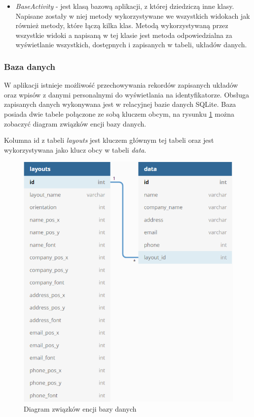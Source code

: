 \documentclass[a4paper,12pt, twoside]{article}
\begin{document}
\begin{itemize}
    	    \item \textit{BaseActivity} - jest klasą bazową aplikacji, z której dziedziczą inne klasy. Napisane zostały w niej metody wykorzystywane we wszystkich widokach jak również metody, które łączą kilka klas. Metodą wykorzystywaną przez wszystkie widoki a napisaną w tej klasie jest metoda odpowiedzialna za wyświetlanie wszystkich, dostępnych i zapisanych w tabeli, układów danych.
    	\end{itemize}
    
    
        \subsubsection{Baza danych}
        W aplikacji istnieje możliwość przechowywania rekordów zapisanych układów oraz wpisów z danymi personalnymi do wyświetlania na identyfikatorze. Obsługa zapisanych danych wykonywana jest w relacyjnej bazie danych SQLite. Baza posiada dwie tabele połączone ze sobą kluczem obcym, na rysunku \ref{fig:database} można zobaczyć diagram związków encji bazy danych. 
        
        Kolumna id z tabeli \textit{layouts} jest kluczem głównym tej tabeli oraz jest wykorzystywana jako klucz obcy w tabeli \textit{data}. 
        
        \begin{figure}[H]
    	        \centering
    	        \vspace{.5cm}
    			\includegraphics[width=12cm]{images/rys_11baza.png}
    			\vspace{.5cm}
    			\caption{Diagram związków encji bazy danych}
                \label{fig:database}
    	\end{figure}
    	
\end{document}
